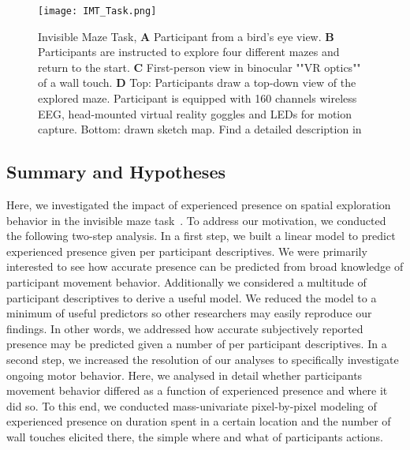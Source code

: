\begin{figure}[h]
\centering
\texttt{[image: IMT\_Task.png]}
\vspace{0pt}
\caption{Invisible Maze Task, \textbf{A} Participant from a bird’s eye view. \textbf{B} Participants are instructed to explore four different mazes and return to the start. \textbf{C} First-person view in binocular ""VR optics"" of a wall touch. \textbf{D} Top: Participants draw a top-down view of the explored maze. Participant is equipped with 160 channels wireless EEG, head-mounted virtual reality goggles and LEDs for motion capture. Bottom: drawn sketch map. Find a detailed description in~\cite{Gehrke2018}}
\label{imt_task}
\end{figure}

\subsection{Summary and Hypotheses}
Here, we investigated the impact of experienced presence on spatial exploration behavior in the invisible maze task~\cite{Gehrke2018}. To address our motivation, we conducted the following two-step analysis. In a first step, we built a linear model to predict experienced presence given per participant descriptives. We were primarily interested to see how accurate presence can be predicted from broad knowledge of participant movement behavior. Additionally we considered a multitude of participant descriptives to derive a useful model. We reduced the model to a minimum of useful predictors so other researchers may easily reproduce our findings. In other words, we addressed how accurate subjectively reported presence may be predicted given a number of per participant descriptives.
In a second step, we increased the resolution of our analyses to specifically investigate ongoing motor behavior. Here, we analysed in detail whether participants movement behavior differed as a function of experienced presence and where it did so. To this end, we conducted mass-univariate pixel-by-pixel modeling of experienced presence on duration spent in a certain location and the number of wall touches elicited there, the simple where and what of participants actions.



